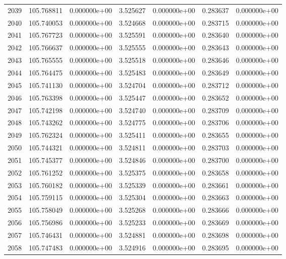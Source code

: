\begin{tabular}{rrrrrrr}
2039 & 105.768811 &  0.000000e+00 &  3.525627 &  0.000000e+00 &    0.283637 &  0.000000e+00 \\
2040 & 105.740053 &  0.000000e+00 &  3.524668 &  0.000000e+00 &    0.283715 &  0.000000e+00 \\
2041 & 105.767723 &  0.000000e+00 &  3.525591 &  0.000000e+00 &    0.283640 &  0.000000e+00 \\
2042 & 105.766637 &  0.000000e+00 &  3.525555 &  0.000000e+00 &    0.283643 &  0.000000e+00 \\
2043 & 105.765555 &  0.000000e+00 &  3.525518 &  0.000000e+00 &    0.283646 &  0.000000e+00 \\
2044 & 105.764475 &  0.000000e+00 &  3.525483 &  0.000000e+00 &    0.283649 &  0.000000e+00 \\
2045 & 105.741130 &  0.000000e+00 &  3.524704 &  0.000000e+00 &    0.283712 &  0.000000e+00 \\
2046 & 105.763398 &  0.000000e+00 &  3.525447 &  0.000000e+00 &    0.283652 &  0.000000e+00 \\
2047 & 105.742198 &  0.000000e+00 &  3.524740 &  0.000000e+00 &    0.283709 &  0.000000e+00 \\
2048 & 105.743262 &  0.000000e+00 &  3.524775 &  0.000000e+00 &    0.283706 &  0.000000e+00 \\
2049 & 105.762324 &  0.000000e+00 &  3.525411 &  0.000000e+00 &    0.283655 &  0.000000e+00 \\
2050 & 105.744321 &  0.000000e+00 &  3.524811 &  0.000000e+00 &    0.283703 &  0.000000e+00 \\
2051 & 105.745377 &  0.000000e+00 &  3.524846 &  0.000000e+00 &    0.283700 &  0.000000e+00 \\
2052 & 105.761252 &  0.000000e+00 &  3.525375 &  0.000000e+00 &    0.283658 &  0.000000e+00 \\
2053 & 105.760182 &  0.000000e+00 &  3.525339 &  0.000000e+00 &    0.283661 &  0.000000e+00 \\
2054 & 105.759115 &  0.000000e+00 &  3.525304 &  0.000000e+00 &    0.283663 &  0.000000e+00 \\
2055 & 105.758049 &  0.000000e+00 &  3.525268 &  0.000000e+00 &    0.283666 &  0.000000e+00 \\
2056 & 105.756986 &  0.000000e+00 &  3.525233 &  0.000000e+00 &    0.283669 &  0.000000e+00 \\
2057 & 105.746431 &  0.000000e+00 &  3.524881 &  0.000000e+00 &    0.283698 &  0.000000e+00 \\
2058 & 105.747483 &  0.000000e+00 &  3.524916 &  0.000000e+00 &    0.283695 &  0.000000e+00 \\

\end{tabular}

